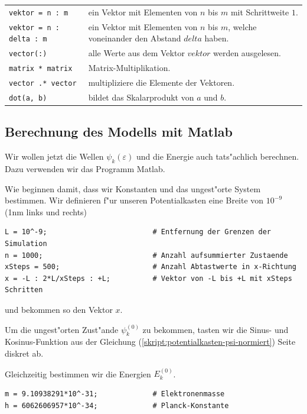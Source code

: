 \begin{refsection}
\begin{center}
	\begin{tabular}{lp{9cm}}
		\verb|vektor = n : m| & ein Vektor mit Elementen von $n$ bis $m$ mit Schrittweite $1$. \\
		\verb|vektor = n : delta : m| & ein Vektor mit Elementen von $n$ bis $m$, welche voneinander den Abstand $delta$ haben. \\
		\verb|vector(:)| & alle Werte aus dem Vektor $vektor$ werden ausgelesen. \\
		\verb|matrix * matrix| & Matrix-Multiplikation. \\
		\verb|vector .* vector| & multipliziere die Elemente der Vektoren. \\
		\verb|dot(a, b)| & bildet das Skalarprodukt von $a$ und $b$.
	\end{tabular}
\end{center}




\subsection{Berechnung des Modells mit Matlab}

Wir wollen jetzt die Wellen $\psi_k(\varepsilon)$ und die Energie auch tats"achlich berechnen.
Dazu verwenden wir das Programm Matlab.

Wie beginnen damit, dass wir Konstanten und das ungest"orte System bestimmen.
Wir definieren f"ur unseren Potentialkasten eine Breite von $10^{-9}$ (1nm links und rechts)
\begin{lstlisting}[style=Matlab]
L = 10^-9;                         # Entfernung der Grenzen der Simulation
n = 1000;                          # Anzahl aufsummierter Zustaende
xSteps = 500;                      # Anzahl Abtastwerte in x-Richtung
x = -L : 2*L/xSteps : +L;          # Vektor von -L bis +L mit xSteps Schritten
\end{lstlisting}
und bekommen so den Vektor $x$.

Um die ungest"orten Zust"ande $\psi_k^{(0)}$ zu bekommen, tasten wir die Sinus- und Kosinus-Funktion 
aus der Gleichung (\ref{skript:potentialkasten-psi-normiert}) Seite \pageref{skript:potentialkasten-psi-normiert} diskret ab.

Gleichzeitig bestimmen wir die Energien $E_k^{(0)}$.
\begin{lstlisting}[style=Matlab]
m = 9.10938291*10^-31;             # Elektronenmasse
h = 6062606957*10^-34;             # Planck-Konstante


\end{lstlisting}
\end{refsection}
